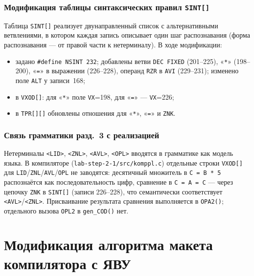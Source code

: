 \documentclass[a4paper,14pt]{extarticle}
\begin{document}
\subsubsection*{Модификация таблицы синтаксических правил \texttt{SINT[]}}

Таблица \texttt{SINT[]} реализует двунаправленный список с альтернативными
ветвлениями, в котором каждая запись описывает один шаг распознавания (форма
распознавания — от правой части к нетерминалу). В ходе модификации:

\begin{itemize}
  \item задано \texttt{\#define NSINT~232}; добавлены ветви \texttt{DEC FIXED} (201--225),
        «\texttt{*}» (198--200), «\texttt{=}» в выражении (226--228), операнд \texttt{RZR} в \texttt{AVI} (229--231);
        изменено поле \texttt{ALT} у записи~168;
  \item в \texttt{VXOD[]}: для «\texttt{*}» поле \texttt{VX}=198, для «\texttt{=}» --- \texttt{VX}=226;
  \item в \texttt{TPR[][]} обновлены отношения для «\texttt{*}», «\texttt{=}» и \texttt{ZNK}.
\end{itemize}

\subsubsection*{Связь грамматики разд.~3 с реализацией}

Нетерминалы \texttt{<LID>}, \texttt{<ZNL>}, \texttt{<AVL>}, \texttt{<OPL>} вводятся в грамматике как модель языка. В компиляторе
(\texttt{lab-step-2-1/src/komppl.c}) отдельные строки \texttt{VXOD[]} для \texttt{LID}/\texttt{ZNL}/\texttt{AVL}/\texttt{OPL} не заводятся:
десятичный множитель в \texttt{C = B * 5} распознаётся как последовательность цифр, сравнение в \texttt{C = A = C} --- через цепочку
\texttt{ZNK} в \texttt{SINT[]} (записи 226--228), что семантически соответствует \texttt{<AVL>}/\texttt{<ZNL>}. Присваивание результата
сравнения выполняется в \texttt{OPA2()}; отдельного вызова \texttt{OPL2} в \texttt{gen\_COD()} нет.

\section{Модификация алгоритма макета компилятора с ЯВУ}
\end{document}
